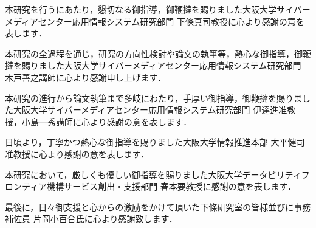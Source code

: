 \acknowledgement
本研究を行うにあたり，懇切なる御指導，御鞭撻を賜りました大阪大学サイバーメディアセンター応用情報システム研究部門 下條真司教授に心より感謝の意を表します．

本研究の全過程を通じ，研究の方向性検討や論文の執筆等，熱心な御指導，御鞭撻を賜りました大阪大学サイバーメディアセンター応用情報システム研究部門 木戸善之講師に心より感謝申し上げます．

本研究の進行から論文執筆まで多岐にわたり，手厚い御指導，御鞭撻を賜りました大阪大学サイバーメディアセンター応用情報システム研究部門 伊達進准教授，小島一秀講師に心より感謝の意を表します．

日頃より，丁寧かつ熱心な御指導を賜りました大阪大学情報推進本部 大平健司准教授に心より感謝の意を表します．

本研究において，厳しくも優しい御指導を賜りました大阪大学データビリティフロンティア機構サービス創出・支援部門 春本要教授に感謝の意を表します．

最後に，日々御支援と心からの激励をかけて頂いた下條研究室の皆様並びに事務補佐員 片岡小百合氏に心より感謝致します．
